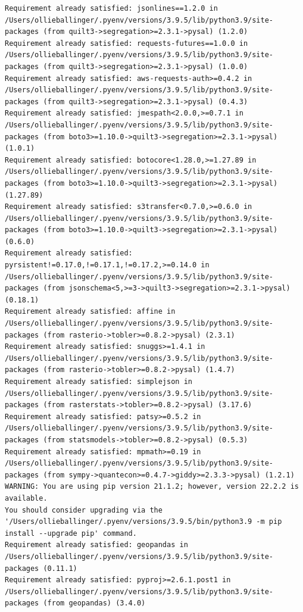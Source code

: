 \documentclass[
  letterpaper,
  DIV=11,
  numbers=noendperiod]{scrreprt}
\begin{document}
\begin{verbatim}
Requirement already satisfied: jsonlines==1.2.0 in /Users/ollieballinger/.pyenv/versions/3.9.5/lib/python3.9/site-packages (from quilt3->segregation>=2.3.1->pysal) (1.2.0)
Requirement already satisfied: requests-futures==1.0.0 in /Users/ollieballinger/.pyenv/versions/3.9.5/lib/python3.9/site-packages (from quilt3->segregation>=2.3.1->pysal) (1.0.0)
Requirement already satisfied: aws-requests-auth>=0.4.2 in /Users/ollieballinger/.pyenv/versions/3.9.5/lib/python3.9/site-packages (from quilt3->segregation>=2.3.1->pysal) (0.4.3)
Requirement already satisfied: jmespath<2.0.0,>=0.7.1 in /Users/ollieballinger/.pyenv/versions/3.9.5/lib/python3.9/site-packages (from boto3>=1.10.0->quilt3->segregation>=2.3.1->pysal) (1.0.1)
Requirement already satisfied: botocore<1.28.0,>=1.27.89 in /Users/ollieballinger/.pyenv/versions/3.9.5/lib/python3.9/site-packages (from boto3>=1.10.0->quilt3->segregation>=2.3.1->pysal) (1.27.89)
Requirement already satisfied: s3transfer<0.7.0,>=0.6.0 in /Users/ollieballinger/.pyenv/versions/3.9.5/lib/python3.9/site-packages (from boto3>=1.10.0->quilt3->segregation>=2.3.1->pysal) (0.6.0)
Requirement already satisfied: pyrsistent!=0.17.0,!=0.17.1,!=0.17.2,>=0.14.0 in /Users/ollieballinger/.pyenv/versions/3.9.5/lib/python3.9/site-packages (from jsonschema<5,>=3->quilt3->segregation>=2.3.1->pysal) (0.18.1)
Requirement already satisfied: affine in /Users/ollieballinger/.pyenv/versions/3.9.5/lib/python3.9/site-packages (from rasterio->tobler>=0.8.2->pysal) (2.3.1)
Requirement already satisfied: snuggs>=1.4.1 in /Users/ollieballinger/.pyenv/versions/3.9.5/lib/python3.9/site-packages (from rasterio->tobler>=0.8.2->pysal) (1.4.7)
Requirement already satisfied: simplejson in /Users/ollieballinger/.pyenv/versions/3.9.5/lib/python3.9/site-packages (from rasterstats->tobler>=0.8.2->pysal) (3.17.6)
Requirement already satisfied: patsy>=0.5.2 in /Users/ollieballinger/.pyenv/versions/3.9.5/lib/python3.9/site-packages (from statsmodels->tobler>=0.8.2->pysal) (0.5.3)
Requirement already satisfied: mpmath>=0.19 in /Users/ollieballinger/.pyenv/versions/3.9.5/lib/python3.9/site-packages (from sympy->quantecon>=0.4.7->giddy>=2.3.3->pysal) (1.2.1)
WARNING: You are using pip version 21.1.2; however, version 22.2.2 is available.
You should consider upgrading via the '/Users/ollieballinger/.pyenv/versions/3.9.5/bin/python3.9 -m pip install --upgrade pip' command.
Requirement already satisfied: geopandas in /Users/ollieballinger/.pyenv/versions/3.9.5/lib/python3.9/site-packages (0.11.1)
Requirement already satisfied: pyproj>=2.6.1.post1 in /Users/ollieballinger/.pyenv/versions/3.9.5/lib/python3.9/site-packages (from geopandas) (3.4.0)

\end{verbatim}
\end{document}
